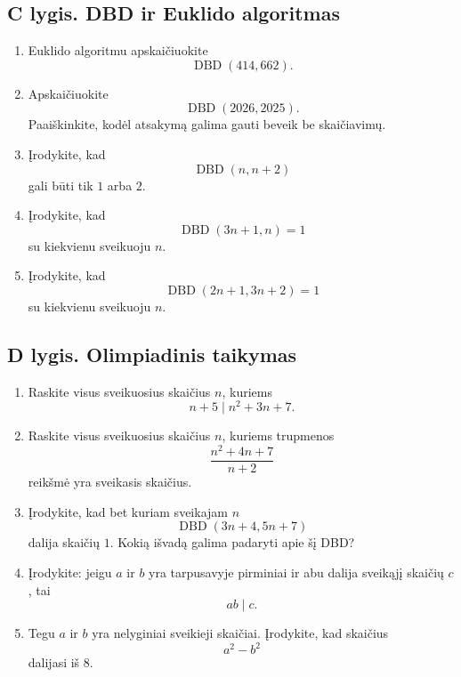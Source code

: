 \documentclass[11pt,a4paper]{scrartcl}
\begin{document}
\subsection{C lygis. DBD ir Euklido algoritmas}

\begin{enumerate}
    \renewcommand{\labelenumi}{\textbf{\theenumi.}}
    \setcounter{enumi}{10}

    \item Euklido algoritmu apskaičiuokite
    \[
    \operatorname{DBD}(414,662).
    \]

    \item Apskaičiuokite
    \[
    \operatorname{DBD}(2026,2025).
    \]
    Paaiškinkite, kodėl atsakymą galima gauti beveik be skaičiavimų.

    \item Įrodykite, kad
    \[
    \operatorname{DBD}(n,n+2)
    \]
    gali būti tik $1$ arba $2$.

    \item Įrodykite, kad
    \[
    \operatorname{DBD}(3n+1,n)=1
    \]
    su kiekvienu sveikuoju $n$.

    \item Įrodykite, kad
    \[
    \operatorname{DBD}(2n+1,3n+2)=1
    \]
    su kiekvienu sveikuoju $n$.

\end{enumerate}

\subsection{D lygis. Olimpiadinis taikymas}

\begin{enumerate}
    \renewcommand{\labelenumi}{\textbf{\theenumi.}}
    \setcounter{enumi}{15}

    \item Raskite visus sveikuosius skaičius $n$, kuriems
    \[
    n+5\mid n^2+3n+7.
    \]

    \item Raskite visus sveikuosius skaičius $n$, kuriems trupmenos
    \[
    \frac{n^2+4n+7}{n+2}
    \]
    reikšmė yra sveikasis skaičius.

    \item Įrodykite, kad bet kuriam sveikajam $n$
    \[
    \operatorname{DBD}(3n+4,5n+7)
    \]
    dalija skaičių $1$. Kokią išvadą galima padaryti apie šį DBD?

    \item Įrodykite: jeigu $a$ ir $b$ yra tarpusavyje pirminiai ir abu dalija
    sveikąjį skaičių $c$, tai
    \[
    ab\mid c.
    \]

    \item Tegu $a$ ir $b$ yra nelyginiai sveikieji skaičiai. Įrodykite, kad
    skaičius
    \[
    a^2-b^2
    \]
    dalijasi iš $8$.

\end{enumerate}
\end{document}
